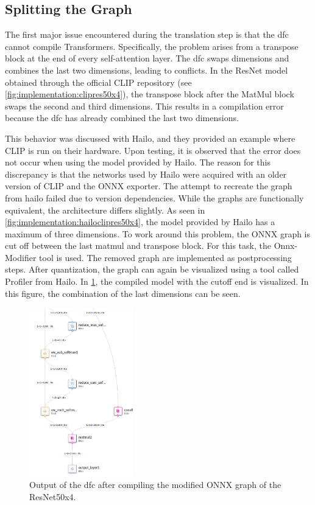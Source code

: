 \subsection{Splitting the Graph}

The first major issue encountered during the translation step is that the \acrshort{dfc} cannot compile Transformers.
Specifically, the problem arises from a transpose block at the end of every self-attention layer.
The \acrshort{dfc} swaps dimensions and combines the last two dimensions, leading to conflicts.
In the ResNet model obtained through the official CLIP repository (see \cref{fig:implementation:clipres50x4}), the transpose block after the MatMul block swaps the second and third dimensions.
This results in a compilation error because the \acrshort{dfc} has already combined the last two dimensions.

This behavior was discussed with Hailo, and they provided an example where CLIP is run on their hardware. Upon testing, it is observed that the error does not occur when using the model provided by Hailo.
The reason for this discrepancy is that the networks used by Hailo were acquired with an older version of CLIP and the ONNX exporter.
The attempt to recreate the graph from hailo failed due to version dependencies.
While the graphs are functionally equivalent, the architecture differs slightly.
As seen in \cref{fig:implementation:hailoclipres50x4}, the model provided by Hailo has a maximum of three dimensions.
To work around this problem, the ONNX graph is cut off between the last matmul and transpose block.
For this task, the Onnx-Modifier tool \cite{onnxmodifier} is used.
The removed graph are implemented as postprocessing steps.
After quantization, the graph can again be visualized using a tool called Profiler from Hailo.
In \cref{fig:implementation:compareRN50x4qunathar}, the compiled model with the cutoff end is visualized.
In this figure, the combination of the last dimensions can be seen.

\begin{figure}
    \centering
    \includegraphics[width=0.4\textwidth]{Images/Implementation/ClipRes50x4_qunat_Har.png}
    \caption{Output of the \acrshort{dfc} after compiling the modified ONNX graph of the ResNet50x4.}
    \label{fig:implementation:compareRN50x4qunathar}
\end{figure}

